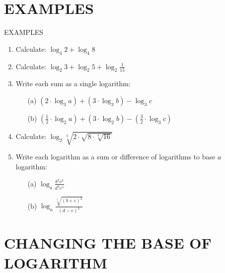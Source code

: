 \documentclass[xcolor=dvipsnames]{beamer}
\begin{document}
\section{EXAMPLES}
\begin{frame}{EXAMPLES}
\begin{exampleblock}


\begin{enumerate}
    \item Calculate: $\log_{4} 2 + \log_{4} 8$
    \item Calculate: $\log_{2} 3 + \log_{2} 5 +    \log_{2} \frac{1}{15}  $ 
    \item Write each sum as a single logarithm:\begin{enumerate}
        \item [(a)] $(2\cdot \log_{3} a ) + (3\cdot \log_{3} b ) -  \log_{3} c $
        \item [(b)]  $(\frac{1}{2}\cdot \log_{2} a ) + (3\cdot \log_{2} b ) - \left( \frac{3}{2}\cdot\log_{3} c \right) $
    \end{enumerate} 
    \item Calculate: $\log_{2}  \sqrt[3]{2\cdot \sqrt{8 \cdot\sqrt[3]{16} }}$ 
     \item Write each logarithm as a sum or difference of logarithms to base $a$ logarithm:\begin{enumerate}
        \item [(a)] $  \log_{a} \frac{b^{3}c^{2}}{d^{4}e^{5}}$
        \item [(b)]  $  \log_{a} \frac{\sqrt[5]{(b+c)^{2}}}{ (d-e)^{3}}$
    \end{enumerate} 
\end{enumerate}
\end{exampleblock}
    
\end{frame}
\section{ CHANGING THE BASE OF LOGARITHM}
\end{document}
